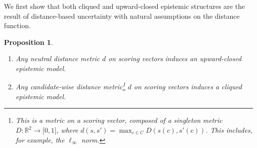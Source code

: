 \documentclass[letterpaper]{article} %
\newtheorem{proposition}[theorem]{Proposition}
\begin{document}
We first show that both cliqued and upward-closed epistemic structures are the result of distance-based uncertainty with natural assumptions on the distance function.
\begin{proposition}\label{prop:metric}
\begin{enumerate}
	\item \label{metric_upward} Any neutral distance metric
	$d$ on scoring vectors induces an upward-closed epistemic model.
 \item \label{metric_clique}Any candidate-wise distance metric\footnote{This is a metric on a scoring vector, composed of a singleton metric $D:\mathbb R^2\rightarrow\mathbb [0,1]$, where $d(s,s')=\max_{c\in C}D(s(c),s'(c))$. This includes, for example, the $\ell_{\infty}$ norm.} $d$ on scoring vectors induces a cliqued epistemic model.
\end{enumerate}
\end{proposition}
\end{document}
